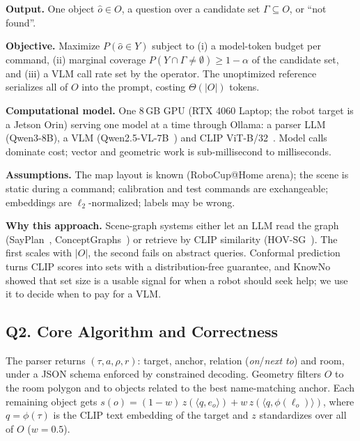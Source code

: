 \documentclass[conference]{IEEEtran}
\newcommand{\cset}{\Gamma}
\begin{document}
\textbf{Output.} One object $\hat o\in O$, a question over a candidate set $\cset\subseteq O$, or ``not found''.

\textbf{Objective.} Maximize $P(\hat o\in Y)$ subject to (i) a model-token budget per command,
(ii) marginal coverage $P(Y\cap\cset\neq\emptyset)\ge 1-\alpha$ of the candidate set, and (iii) a VLM call rate
set by the operator. The unoptimized reference serializes all of $O$ into the prompt, costing $\Theta(|O|)$ tokens.

\textbf{Computational model.} One 8\,GB GPU (RTX 4060 Laptop; the robot target is a Jetson Orin) serving one
model at a time through Ollama: a parser LLM (Qwen3-8B), a VLM (Qwen2.5-VL-7B~\cite{bai2025qwen25vl}) and CLIP
ViT-B/32~\cite{radford2021clip}. Model calls dominate cost; vector and geometric work is sub-millisecond to
milliseconds.

\textbf{Assumptions.} The map layout is known (RoboCup@Home arena); the scene is static during a command;
calibration and test commands are exchangeable; embeddings are $\ell_2$-normalized; labels may be wrong.

\textbf{Why this approach.} Scene-graph systems either let an LLM read the graph
(SayPlan~\cite{rana2023sayplan}, ConceptGraphs~\cite{gu2024conceptgraphs}) or retrieve by CLIP
similarity (HOV-SG~\cite{werby2024hovsg}). The first scales with $|O|$, the second fails on abstract queries.
Conformal prediction~\cite{vovk2005algorithmic,angelopoulos2023gentle} turns CLIP scores into sets with a
distribution-free guarantee, and KnowNo~\cite{ren2023knowno} showed that set size is a usable signal for when
a robot should seek help; we use it to decide when to pay for a VLM.

\subsection{Q2. Core Algorithm and Correctness}
The parser returns $(\tau,a,\rho,r)$: target, anchor, relation (\emph{on}/\emph{next to}) and room, under a JSON
schema enforced by constrained decoding. Geometry filters $O$ to the room polygon and to objects related to the best
name-matching anchor. Each remaining object gets
$s(o)=(1-w)\,z(\langle q,e_o\rangle)+w\,z(\langle q,\phi(\ell_o)\rangle)$, where $q=\phi(\tau)$ is the CLIP text
embedding of the target and $z$ standardizes over all of $O$ ($w=0.5$).
\end{document}
